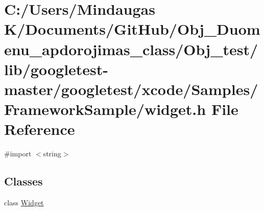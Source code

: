 \hypertarget{_obj__test_2lib_2googletest-master_2googletest_2xcode_2_samples_2_framework_sample_2widget_8h}{}\section{C\+:/\+Users/\+Mindaugas K/\+Documents/\+Git\+Hub/\+Obj\+\_\+\+Duomenu\+\_\+apdorojimas\+\_\+class/\+Obj\+\_\+test/lib/googletest-\/master/googletest/xcode/\+Samples/\+Framework\+Sample/widget.h File Reference}
\label{_obj__test_2lib_2googletest-master_2googletest_2xcode_2_samples_2_framework_sample_2widget_8h}
{\ttfamily \#import $<$string$>$}\newline
\subsection*{Classes}
\begin{DoxyCompactItemize}
\item 
class \mbox{\hyperlink{class_widget}{Widget}}
\end{DoxyCompactItemize}
